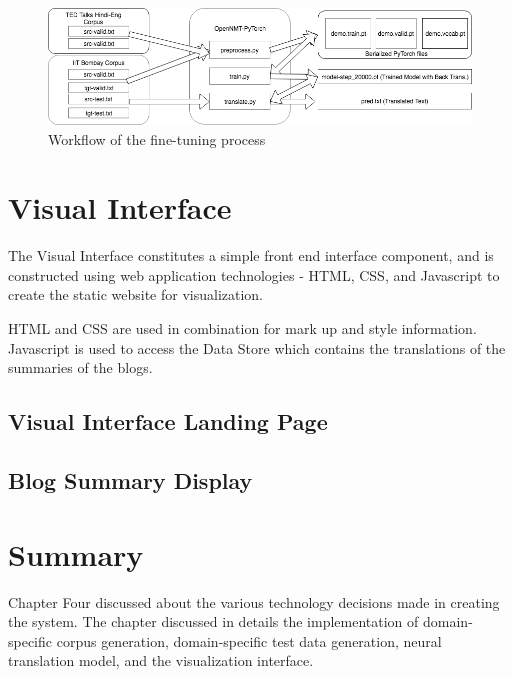 \begin{figure}[h]
\includegraphics[width=\textwidth]{figures/nmtworkflow1.png}
\caption{Workflow of the fine-tuning process} 
\label{nmtwork1}
\end{figure}

\section{Visual Interface}
The Visual Interface constitutes a simple front end interface component, and is constructed using web application technologies - HTML, CSS, and Javascript to create the static website for visualization.

HTML and CSS are used in combination for mark up and style information. Javascript is used to access the Data Store which contains the translations of the summaries of the blogs.

\subsection{Visual Interface Landing Page}
\subsection{Blog Summary Display}
\section{Summary}
Chapter Four discussed about the various technology decisions made in creating the system. The chapter discussed in details the implementation of domain-specific corpus generation, domain-specific test data generation, neural translation model, and the visualization interface.